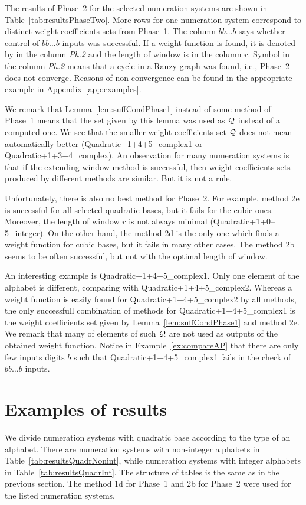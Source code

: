 The results of Phase~2 for the selected numeration systems are shown in Table~\ref{tab:resultsPhaseTwo}. More rows for one numeration system correspond to distinct weight coefficients sets from Phase~1. The column $bb\dots b$ says whether control of $bb\dots b$ inputs was successful. If a weight function is found, it is denoted by \checkmark{} in the column \emph{Ph.2} and the length of window is in the column $r$. Symbol \xmark{} in the column \emph{Ph.2} means that a cycle in a Rauzy graph was found, i.e., Phase~2 does not converge. Reasons of non-convergence can be found in the appropriate example in Appendix~\ref{app:examples}.

We remark that Lemma~\ref{lem:suffCondPhase1} instead of some method of Phase~1 means that the set given by this lemma was used as $\mathcal{Q}$ instead of a computed one.  We see that the smaller weight coefficients set $\mathcal{Q}$ does not mean automatically better (Quadratic+1+4+5\_complex1 or Quadratic+1+3+4\_complex). An observation for many numeration systems is that if the extending window method is successful, then weight coefficients sets produced by different methods are similar. But it is not a rule. 

Unfortunately, there is also no best method for Phase~2. For example, method 2e is successful for all selected quadratic bases, but it fails for the cubic ones. Moreover, the length of window $r$ is not always minimal (Quadratic+1+0--5\_integer). On the other hand, the method 2d is the only one which finds a weight function for cubic bases, but it fails in many other cases. The method 2b seems to be often successful, but not with the optimal length of window.

An interesting example is Quadratic+1+4+5\_complex1. Only one element of the alphabet is different, comparing with Quadratic+1+4+5\_complex2. Whereas a weight function is easily found for Quadratic+1+4+5\_complex2 by all methods, the only successfull combination of methods for Quadratic+1+4+5\_complex1 is the weight coefficients set given by Lemma~\ref{lem:suffCondPhase1} and method 2e. We remark that many of elements of such $\mathcal{Q}$ are not used as outputs of the obtained weight function. Notice  in Example~\ref{ex:compareAP} that there are only few inputs digits $b$ such that  Quadratic+1+4+5\_complex1 fails in the check of $bb\dots b$ inputs.





\section{Examples of results}
\label{sec:resultsExamples}
We divide numeration systems with quadratic base according to the type of an alphabet. There are numeration systems with non-integer alphabets in Table~\ref{tab:resultsQuadrNonint}, while numeration systems with integer alphabets in Table~\ref{tab:resultsQuadrInt}. The structure of tables is the same as in the previous section. The method 1d for Phase~1 and 2b for Phase~2 were used for the listed numeration systems.


